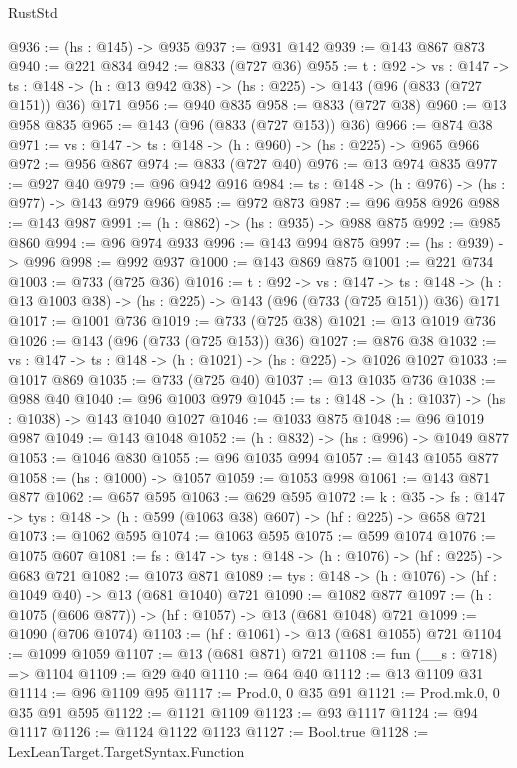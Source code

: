 \begin{lexlean}{RustStd}
\begin{coremodule}
@936 := (hs : @145) -> @935
@937 := @931 @142
@939 := @143 @867 @873
@940 := @221 @834
@942 := @833 (@727 @36)
@955 := {t : @92} ->
  {vs : @147} ->
  {ts : @148} -> (h : @13 @942 @38) -> (hs : @225) -> @143 (@96 (@833 (@727 @151)) @36) @171
@956 := @940 @835
@958 := @833 (@727 @38)
@960 := @13 @958 @835
@965 := @143 (@96 (@833 (@727 @153)) @36)
@966 := @874 @38
@971 := {vs : @147} -> {ts : @148} -> (h : @960) -> (hs : @225) -> @965 @966
@972 := @956 @867
@974 := @833 (@727 @40)
@976 := @13 @974 @835
@977 := @927 @40
@979 := @96 @942 @916
@984 := {ts : @148} -> (h : @976) -> (hs : @977) -> @143 @979 @966
@985 := @972 @873
@987 := @96 @958 @926
@988 := @143 @987
@991 := (h : @862) -> (hs : @935) -> @988 @875
@992 := @985 @860
@994 := @96 @974 @933
@996 := @143 @994 @875
@997 := (hs : @939) -> @996
@998 := @992 @937
@1000 := @143 @869 @875
@1001 := @221 @734
@1003 := @733 (@725 @36)
@1016 := {t : @92} ->
  {vs : @147} ->
  {ts : @148} -> (h : @13 @1003 @38) -> (hs : @225) -> @143 (@96 (@733 (@725 @151)) @36) @171
@1017 := @1001 @736
@1019 := @733 (@725 @38)
@1021 := @13 @1019 @736
@1026 := @143 (@96 (@733 (@725 @153)) @36)
@1027 := @876 @38
@1032 := {vs : @147} -> {ts : @148} -> (h : @1021) -> (hs : @225) -> @1026 @1027
@1033 := @1017 @869
@1035 := @733 (@725 @40)
@1037 := @13 @1035 @736
@1038 := @988 @40
@1040 := @96 @1003 @979
@1045 := {ts : @148} -> (h : @1037) -> (hs : @1038) -> @143 @1040 @1027
@1046 := @1033 @875
@1048 := @96 @1019 @987
@1049 := @143 @1048
@1052 := (h : @832) -> (hs : @996) -> @1049 @877
@1053 := @1046 @830
@1055 := @96 @1035 @994
@1057 := @143 @1055 @877
@1058 := (hs : @1000) -> @1057
@1059 := @1053 @998
@1061 := @143 @871 @877
@1062 := @657 @595
@1063 := @629 @595
@1072 := {k : @35} ->
  {fs : @147} -> {tys : @148} -> (h : @599 (@1063 @38) @607) -> (hf : @225) -> @658 @721
@1073 := @1062 @595
@1074 := @1063 @595
@1075 := @599 @1074
@1076 := @1075 @607
@1081 := {fs : @147} -> {tys : @148} -> (h : @1076) -> (hf : @225) -> @683 @721
@1082 := @1073 @871
@1089 := {tys : @148} -> (h : @1076) -> (hf : @1049 @40) -> @13 (@681 @1040) @721
@1090 := @1082 @877
@1097 := (h : @1075 (@606 @877)) -> (hf : @1057) -> @13 (@681 @1048) @721
@1099 := @1090 (@706 @1074)
@1103 := (hf : @1061) -> @13 (@681 @1055) @721
@1104 := @1099 @1059
@1107 := @13 (@681 @871) @721
@1108 := fun (__s : @718) => @1104
@1109 := @29 @40
@1110 := @64 @40
@1112 := @13 @1109 @31
@1114 := @96 @1109 @95
@1117 := Prod.{0, 0} @35 @91
@1121 := Prod.mk.{0, 0} @35 @91 @595
@1122 := @1121 @1109
@1123 := @93 @1117
@1124 := @94 @1117
@1126 := @1124 @1122 @1123
@1127 := Bool.true
@1128 := LexLeanTarget.TargetSyntax.Function

\end{coremodule}
\end{lexlean}
